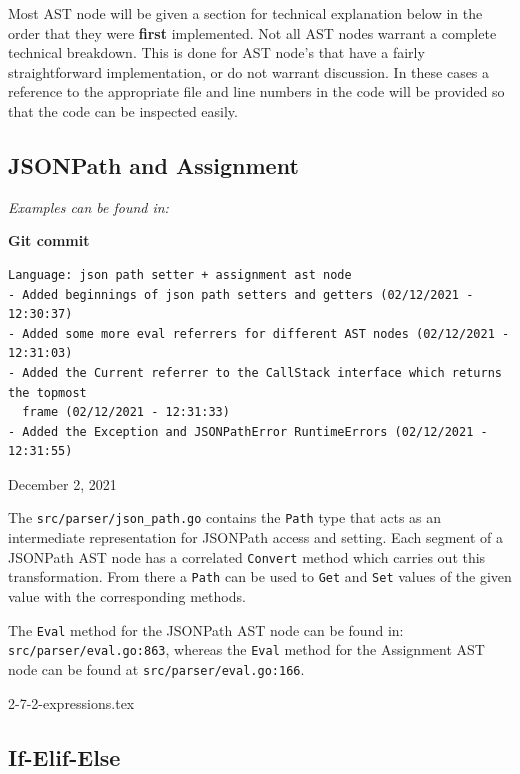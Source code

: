 \documentclass[]{full}
\theoremstyle{definition}
\begin{document}
Most AST node will be given a section for technical explanation below in the order that they were \textbf{first} implemented. Not all AST nodes warrant a complete technical breakdown. This is done for AST node's that have a fairly straightforward implementation, or do not warrant discussion. In these cases a reference to the appropriate file and line numbers in the code will be provided so that the code can be inspected easily.

\subsection{JSONPath and Assignment}

\textit{Examples can be found in: }

\begin{center}
    \textbf{Git commit}
    \begin{verbatim}
Language: json path setter + assignment ast node
- Added beginnings of json path setters and getters (02/12/2021 - 12:30:37)
- Added some more eval referrers for different AST nodes (02/12/2021 - 12:31:03)
- Added the Current referrer to the CallStack interface which returns the topmost
  frame (02/12/2021 - 12:31:33)
- Added the Exception and JSONPathError RuntimeErrors (02/12/2021 - 12:31:55)
    \end{verbatim}
    \vspace{-1em}
    \tiny{December 2, 2021}
\end{center}

The \verb|src/parser/json_path.go| contains the \verb|Path| type that acts as an intermediate representation for JSONPath access and setting. Each segment of a JSONPath AST node has a correlated \verb|Convert| method which carries out this transformation. From there a \verb|Path| can be used to \verb|Get| and \verb|Set| values of the given value with the corresponding methods.

The \verb|Eval| method for the JSONPath AST node can be found in: \verb|src/parser/eval.go:863|, whereas the \verb|Eval| method for the Assignment AST node can be found at \verb|src/parser/eval.go:166|.

{2-7-2-expressions.tex}

\subsection{If-Elif-Else}
\end{document}
